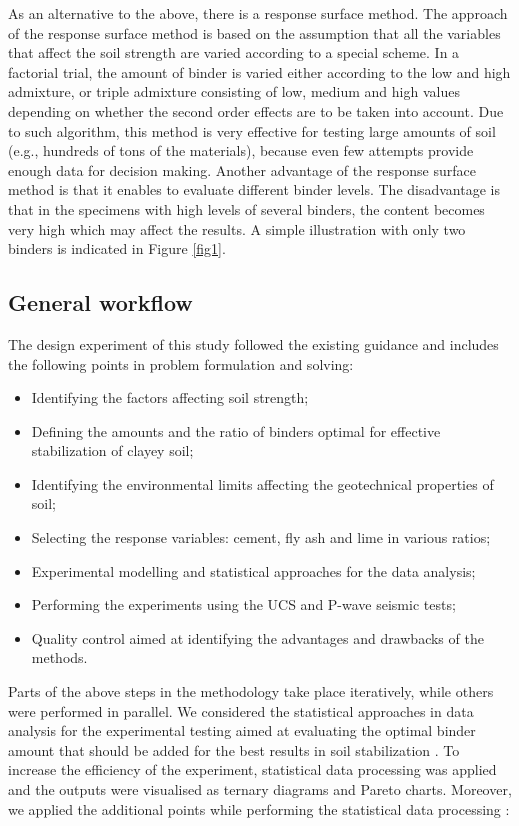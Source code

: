 \documentclass[constrmater,article,submit,pdftex,moreauthors]{Definitions/mdpi}
\begin{document}
As an alternative to the above, there is a response surface method. The approach of the response surface method is based on the assumption that all the variables that affect the soil strength are varied according to a special scheme. In a factorial trial, the amount of binder is varied either according to the low and high admixture, or triple admixture consisting of low, medium and high values depending on whether the second order effects are to be taken into account. Due to such algorithm, this method is very effective for testing large amounts of soil (e.g., hundreds of tons of the materials), because even few attempts provide enough data for decision making. Another advantage of the response surface method is that it enables to evaluate different binder levels. The disadvantage is that in the specimens with high levels of several binders, the content becomes very high which may affect the results. A simple illustration with only two binders is indicated in Figure \ref{fig1}.

\subsection{General workflow}

The design experiment of this study followed the existing guidance \cite{Montgomery1997} and includes the following points in problem formulation and solving: 

\begin{itemize}
	\item	 Identifying the factors affecting soil strength;
	\item Defining the amounts and the ratio of binders optimal for effective stabilization of clayey soil; 
	\item Identifying the environmental limits affecting the geotechnical properties of soil;
	\item Selecting the response variables: cement, fly ash and lime in various ratios;
	\item Experimental modelling and statistical approaches for the data analysis;
	\item Performing the experiments using the UCS and P-wave seismic tests;
	\item Quality control aimed at identifying the advantages and drawbacks of the methods.
\end{itemize}

Parts of the above steps in the methodology take place iteratively, while others were performed in parallel. We considered the statistical approaches in data analysis for the experimental testing aimed at evaluating the optimal binder amount that should be added for the best results in soil stabilization \citep{Box}. To increase the efficiency of the experiment, statistical data processing was applied and the outputs were visualised as ternary diagrams and Pareto charts. Moreover, we applied the additional points while performing the statistical data processing \cite{Montgomery1997}: 
\end{document}
